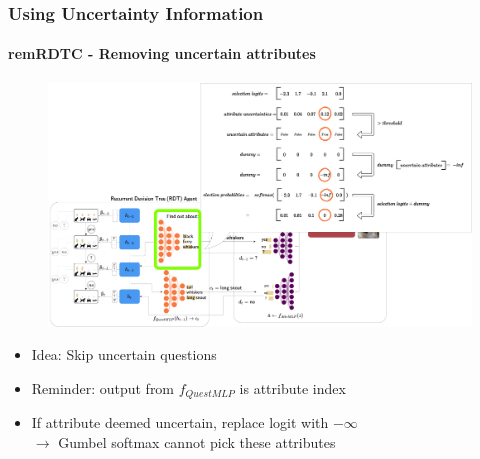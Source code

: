 \documentclass[9pt]{beamer}
\begin{document}
\begin{frame}
\frametitle{Using Uncertainty Information}
\framesubtitle{remRDTC - Removing uncertain attributes}
\begin{figure}
	\includegraphics[width=0.8\linewidth]{images/how_to_remRDTC.pdf}
\end{figure}
\begin{itemize}
	\item Idea: Skip uncertain questions
	\item Reminder: output from $f_{QuestMLP}$ is attribute index %
	\item If attribute deemed uncertain, replace logit with $-\infty$\\ $\rightarrow$ Gumbel softmax cannot pick these attributes
\end{itemize}
\end{frame}
\end{document}
